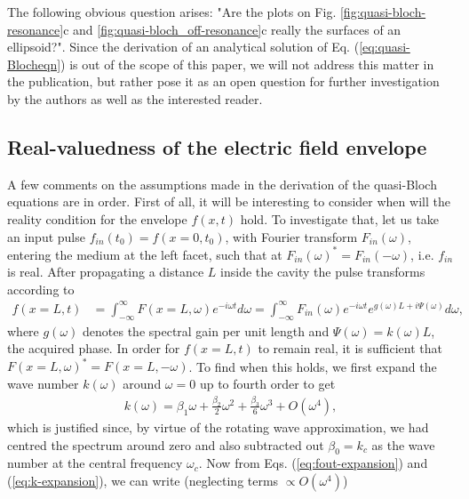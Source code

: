 \documentclass[]{spie}  %
\begin{document}
The following obvious question arises: "Are the plots on Fig. \ref{fig:quasi-bloch-resonance}c and \ref{fig:quasi-bloch_off-resonance}c really the surfaces of an ellipsoid?". Since the derivation of an analytical solution of Eq. (\ref{eq:quasi-Blocheqn}) is out of the scope of this paper, we will not address this matter in the publication, but rather pose it as an open question for further investigation by the authors as well as the interested reader.  

\begin{appendices}
\section{Real-valuedness of the electric field envelope}
\label{sec:appendix-A}
A few comments on the assumptions made in the derivation of the quasi-Bloch equations are in order. First of all, it will be interesting to consider when will the reality condition for the envelope $f(x,t) $  hold. To investigate that, let us take an input pulse $f_{in}(t_0) = f(x=0,t_0)$, with Fourier transform $F_{in}(\omega)$, entering the medium at the left facet, such that at $F_{in}(\omega)^* = F_{in}(-\omega)$, i.e. $f_{in}$ is real. After propagating a distance $L$ inside the cavity the pulse transforms according to \cite{weiner2011ultrafast}
\begin{align}
\label{eq:fout-expansion}
f(x=L,t) &= \int_{-\infty}^{\infty} F(x=L,\omega)e^{-i\omega t}d\omega = \int_{-\infty}^{\infty} F_{in}(\omega)e^{-i\omega t}e^{g(\omega)L+i\Psi(\omega)}d\omega,
\end{align}
where $g(\omega)$ denotes the spectral gain per unit length and $\Psi(\omega)=k(\omega)L$, the acquired phase. In order for $f(x=L,t)$ to remain real, it is sufficient that $F(x=L,\omega)^*= F(x=L,-\omega)$. To find when this holds, we first expand the wave number $k(\omega)$ around $\omega=0$ up to fourth order to get  
\begin{align}
\label{eq:k-expansion}
k(\omega) = \beta_1\omega + \frac{\beta_2}{2}\omega^2 + \frac{\beta_3}{6}\omega^3 + O(\omega^4), 
\end{align}
which is justified since, by virtue of the rotating wave approximation, we had centred the spectrum around zero and also subtracted out $\beta_0 = k_c$ as the wave number at the central frequency $\omega_c$. Now from Eqs. (\ref{eq:fout-expansion}) and (\ref{eq:k-expansion}), we can write (neglecting terms $\propto O(\omega^4)$)
\begin{subequations}
	\begin{align}

\end{align}
\end{subequations}
\end{appendices}
\end{document}
